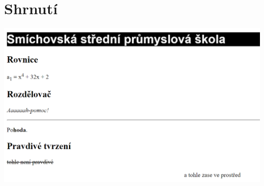 \documentclass[aspectratio=1610]{beamer}
\begin{document}
\section{Shrnutí}

\begin{frame}
    \begin{center}
        \includegraphics[width=\textwidth]{img/html-7-8-ukol.png}
    \end{center}
\end{frame}
\end{document}
